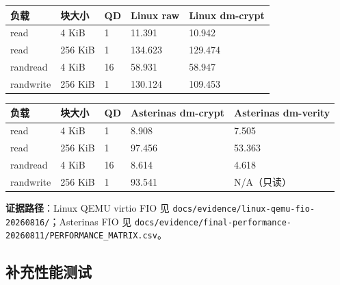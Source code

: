 \begin{table}[H]
    \centering
    \begin{tabular}{p{}p{}p{}p{}p{}}
        \toprule
        \textbf{负载} & \textbf{块大小} & \textbf{QD} & \textbf{Linux raw} & \textbf{Linux dm-crypt} \\
        \midrule
        read & 4 KiB & 1 & 11.391 & 10.942 \\
        read & 256 KiB & 1 & 134.623 & 129.474 \\
        randread & 4 KiB & 16 & 58.931 & 58.947 \\
        randwrite & 256 KiB & 1 & 130.124 & 109.453 \\
        \bottomrule
    \end{tabular}
\end{table}

\begin{table}[H]
    \centering
    \begin{tabular}{p{}p{}p{}p{}p{}}
        \toprule
        \textbf{负载} & \textbf{块大小} & \textbf{QD} & \textbf{Asterinas dm-crypt} & \textbf{Asterinas dm-verity} \\
        \midrule
        read & 4 KiB & 1 & 8.908 & 7.505 \\
        read & 256 KiB & 1 & 97.456 & 53.363 \\
        randread & 4 KiB & 16 & 8.614 & 4.618 \\
        randwrite & 256 KiB & 1 & 93.541 & N/A（只读） \\
        \bottomrule
    \end{tabular}
\end{table}

\textbf{证据路径}：Linux QEMU virtio FIO 见 \texttt{docs/evidence/linux-qemu-fio-20260816/}；Asterinas FIO 见 \texttt{docs/evidence/final-performance-20260811/PERFORMANCE\_MATRIX.csv}。

\subsection{补充性能测试}

